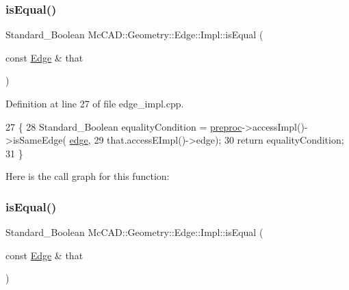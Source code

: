 \mbox{\label{classMcCAD_1_1Geometry_1_1Edge_1_1Impl_a318436db9969dfd122b8472c900b5b85}} 
\subsubsection{\texorpdfstring{is\+Equal()}{isEqual()}\hspace{0.1cm}{\footnotesize\ttfamily [1/2]}}
{\footnotesize\ttfamily Standard\+\_\+\+Boolean Mc\+C\+A\+D\+::\+Geometry\+::\+Edge\+::\+Impl\+::is\+Equal (\begin{DoxyParamCaption}\item[{const \hyperlink{classMcCAD_1_1Geometry_1_1Edge}{Edge} \&}]{that }\end{DoxyParamCaption})}



Definition at line 27 of file edge\+\_\+impl.\+cpp.


\begin{DoxyCode}
27                                               \{
28   Standard\_Boolean equalityCondition = \hyperlink{classMcCAD_1_1Geometry_1_1Edge_1_1Impl_a4921c9d696c5edbfe28ca3ff12d96145}{preproc}->accessImpl()->isSameEdge(
      \hyperlink{classMcCAD_1_1Geometry_1_1Edge_1_1Impl_af6c62d8c4fb496f202ea8029a1304f5c}{edge},
29                                that.accessEImpl()->edge);
30   \textcolor{keywordflow}{return} equalityCondition;
31 \}
\end{DoxyCode}
Here is the call graph for this function\+:
\mbox{\label{classMcCAD_1_1Geometry_1_1Edge_1_1Impl_a318436db9969dfd122b8472c900b5b85}} 
\subsubsection{\texorpdfstring{is\+Equal()}{isEqual()}\hspace{0.1cm}{\footnotesize\ttfamily [2/2]}}
{\footnotesize\ttfamily Standard\+\_\+\+Boolean Mc\+C\+A\+D\+::\+Geometry\+::\+Edge\+::\+Impl\+::is\+Equal (\begin{DoxyParamCaption}\item[{const \hyperlink{classMcCAD_1_1Geometry_1_1Edge}{Edge} \&}]{that }\end{DoxyParamCaption})}




